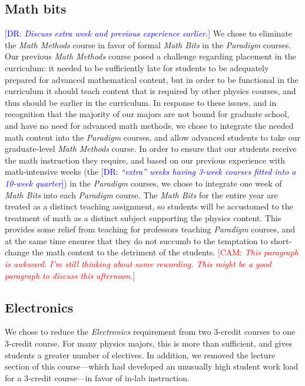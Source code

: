 \documentclass[english,aps,pra,reprint,noshowpacs,superscriptaddress]{revtex4-1}
\newcommand\corinnesays[1]{\textcolor{red}{[\sc CAM: {\em#1}]}}
\newcommand\davidsays[1]{\textcolor{blue}{[\sc DR: {\em#1}]}}
\begin{document}
\subsection{Math bits}
\davidsays{Discuss extra week and previous experience earlier.}
We chose to eliminate the \emph{Math Methods} course in favor of formal
\emph{Math Bits} in the \emph{Paradigm} courses.  Our previous \emph{Math Methods} course
posed a challenge regarding placement in the curriculum: it needed to
be sufficiently late for students to be adequately prepared
for advanced mathematical content, but in order to be functional in
the curriculum it should teach content that is required by other
physics courses, and thus should be earlier in the curriculum.  In
response to these issues, and in recognition that the majority of our
majors are not bound for graduate school, and have no need for
advanced math methods, we chose to integrate the needed math content
into the \emph{Paradigm} courses, and allow advanced students to take our
graduate-level \emph{Math Methods} course.  In order to ensure that our
students receive the math instruction they require, and based on
our previous experience with math-intensive weeks (the \davidsays{``extra''
weeks having 3-week courses fitted into a 10-week quarter})
in the \emph{Paradigm} courses, we chose to integrate one week of \emph{Math Bits} into
each \emph{Paradigm} course.  The \emph{Math Bits} for the entire year are treated as a
distinct teaching assignment, so students will be accustomed to the
treatment of math as a distinct subject supporting the physics
content.  This provides some relief from teaching for
professors teaching \emph{Paradigm} courses, and at the same time ensures
that they do not succumb to the temptation to short-change the math content
to the detriment of the students.
\corinnesays{This paragraph is awkward.  I'm still thinking about some rewording.  This might be a good paragraph to discuss this afternoon.}

\subsection{Electronics}
We chose to reduce the \emph{Electronics} requirement from two 3-credit
courses to one 3-credit course.  For many physics majors, this is more
than sufficient, and gives students a greater number of electives.  In
addition, we removed the lecture section of this course---which had
developed an unusually high student work load for a 3-credit
course---in favor of in-lab instruction.
\end{document}
